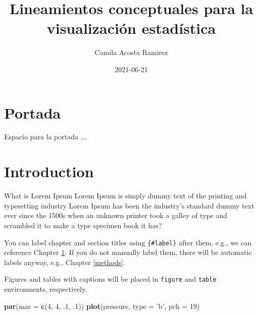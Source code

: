 \documentclass[
]{book}
\title{Lineamientos conceptuales para la visualización estadística}
\author{Camila Acosta Ramirez}
\date{2021-06-21}
\newenvironment{Shaded}{\begin{snugshade}}{\end{snugshade}}
\newcommand{\DataTypeTok}[1]{\textcolor[rgb]{0.13,0.29,0.53}{#1}}
\newcommand{\DecValTok}[1]{\textcolor[rgb]{0.00,0.00,0.81}{#1}}
\newcommand{\FloatTok}[1]{\textcolor[rgb]{0.00,0.00,0.81}{#1}}
\newcommand{\KeywordTok}[1]{\textcolor[rgb]{0.13,0.29,0.53}{\textbf{#1}}}
\newcommand{\NormalTok}[1]{#1}
\newcommand{\StringTok}[1]{\textcolor[rgb]{0.31,0.60,0.02}{#1}}
\begin{document}
\maketitle

{
\setcounter{tocdepth}{1}
\tableofcontents
}
\hypertarget{portada}{%
\chapter*{Portada}\label{portada}}

Espacio para la portada \ldots.

\hypertarget{intro}{%
\chapter{Introduction}\label{intro}}

What is Lorem Ipsum Lorem Ipsum is simply dummy text of the printing and typesetting industry Lorem Ipsum has been the industry's standard dummy text ever since the 1500s when an unknown printer took a galley of type and scrambled it to make a type specimen book it has?

You can label chapter and section titles using \texttt{\{\#label\}} after them, e.g., we can reference Chapter \ref{intro}. If you do not manually label them, there will be automatic labels anyway, e.g., Chapter \ref{methods}.

Figures and tables with captions will be placed in \texttt{figure} and \texttt{table} environments, respectively.

\begin{Shaded}
\begin{Highlighting}[]
\KeywordTok{par}\NormalTok{(}\DataTypeTok{mar =} \KeywordTok{c}\NormalTok{(}\DecValTok{4}\NormalTok{, }\DecValTok{4}\NormalTok{, }\FloatTok{.1}\NormalTok{, }\FloatTok{.1}\NormalTok{))}
\KeywordTok{plot}\NormalTok{(pressure, }\DataTypeTok{type =} \StringTok{'b'}\NormalTok{, }\DataTypeTok{pch =} \DecValTok{19}\NormalTok{)}
\end{Highlighting}
\end{Shaded}
\end{document}
